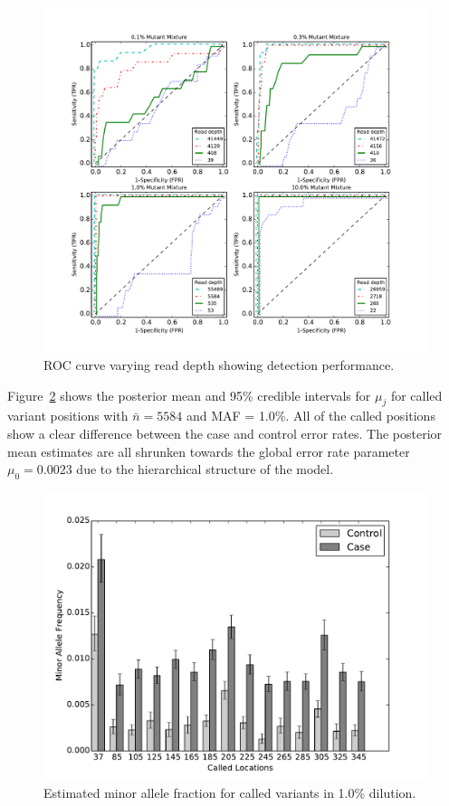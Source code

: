 \documentclass[11pt,reqno]{amsart}
\begin{document}
\begin{figure}[htbp]
\begin{center}
\includegraphics[width=120mm]{pdf_figs/ROC_without_chi2.pdf}
\caption{ROC curve varying read depth showing detection performance.}
\label{fig:ROC}
\end{center}
\end{figure}

Figure~\ref{fig:MAF} shows the posterior mean and 95\% credible intervals for $\mu_j$ for called variant positions with $\bar{n} = 5584$ and MAF = 1.0\%. All of the called positions show a clear difference between the case and control error rates. The posterior mean estimates are all shrunken towards the global error rate parameter $\mu_0 = 0.0023$ due to the hierarchical structure of the model.

\begin{figure}[h]
\begin{center}
\includegraphics[width=120mm]{pdf_figs/Synthetic_Mubarplot_MAF1_0_Depth5584.pdf}
\caption{Estimated minor allele fraction for called variants in 1.0\% dilution.}
\label{fig:MAF}
\end{center}
\end{figure}
\end{document}
